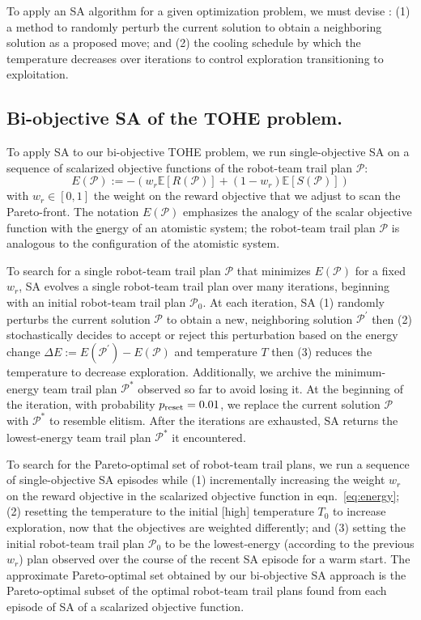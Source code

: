 \documentclass[fleqn,10pt,lineno]{wlpeerj}
\begin{document}
  
  To apply an SA algorithm for a given optimization problem, we must devise \cite{simon2013evolutionary}: 
  (1) a method to randomly perturb the current solution to obtain a neighboring solution as a proposed move; and 
  (2) the cooling schedule by which the temperature decreases over iterations to control exploration transitioning to exploitation.
    
\subsection{Bi-objective SA of the TOHE problem.}
To apply SA to our bi-objective TOHE problem, we run single-objective SA on a sequence of scalarized objective functions of the robot-team trail plan $\mathcal{P}$:
\begin{equation}
	E(\mathcal{P}):= -\left( w_r \mathbb{E}[R(\mathcal{P})] + (1-w_r )\mathbb{E}[S(\mathcal{P})]  \right) \label{eq:energy}
\end{equation} with $w_r \in [0, 1]$ the weight on the reward objective that we adjust to scan the Pareto-front. 
The notation $E(\mathcal{P})$ emphasizes the analogy of the scalar objective function with the \underline{e}nergy of an atomistic system; the robot-team trail plan $\mathcal{P}$ is analogous to the configuration of the atomistic system.

To search for a single robot-team trail plan $\mathcal{P}$ that minimizes $E(\mathcal{P})$ for a fixed $w_r$, SA evolves a single robot-team trail plan over many iterations, beginning with an initial robot-team trail plan $\mathcal{P}_0$.
At each iteration, SA 
   (1) randomly perturbs the current solution $\mathcal{P}$ to obtain a new, neighboring solution $\mathcal{P}^\prime$ then 
   (2) stochastically decides to accept or reject this perturbation based on the energy change $\Delta E:= E(\mathcal{P^\prime})- E(\mathcal{P})$ and temperature $T$ then   
   (3) reduces the temperature to decrease exploration. 
Additionally, we archive the minimum-energy team trail plan $\mathcal{P}^*$ observed so far to avoid losing it. At the beginning of the iteration, with probability $p_{\rm reset}=0.01$, we replace the current solution $\mathcal{P}$ with $\mathcal{P}^*$ to resemble elitism. 
After the iterations are exhausted, SA returns the lowest-energy team trail plan $\mathcal{P}^*$ it encountered.

To search for the Pareto-optimal set of robot-team trail plans, we run a sequence of single-objective SA episodes while
(1) incrementally increasing the weight $w_r$ on the reward objective in the scalarized objective function in eqn.~\ref{eq:energy};
(2) resetting the temperature to the initial [high] temperature $T_0$ to increase exploration, now that the objectives are weighted differently; and
(3) setting the initial robot-team trail plan $\mathcal{P}_0$ to be the lowest-energy (according to the previous $w_r$) plan observed over the course of the recent SA episode for a warm start.
The approximate Pareto-optimal set obtained by our bi-objective SA approach is the Pareto-optimal subset of the optimal robot-team trail plans found from each episode of SA of a scalarized objective function.
\end{document}
